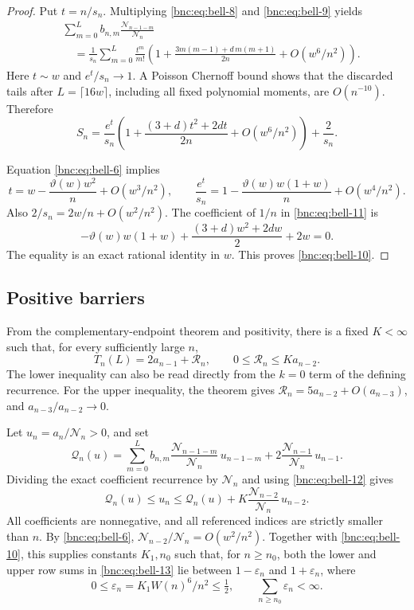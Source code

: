 \documentclass[11pt]{article}
\numberwithin{equation}{section}
\theoremstyle{definition}
\theoremstyle{remark}
\begin{document}
\begin{proof}
Put \(t=n/s_n\).
Multiplying \eqref{bnc:eq:bell-8} and \eqref{bnc:eq:bell-9} yields
\[
 \begin{split}
 &\sum_{m=0}^{L}b_{n,m}
          \frac{\mathcal N_{n-1-m}}{\mathcal N_n}\\
 &\quad=
 \frac1{s_n}\sum_{m=0}^{L}\frac{t^m}{m!}
 \left(1+\frac{3m(m-1)+d\,m(m+1)}{2n}
        +O(w^6/n^2)\right).
 \end{split}
\]
Here \(t\sim w\) and \(e^t/s_n\to1\).
A Poisson Chernoff bound shows that the discarded tails after
\(L=\lceil16w\rceil\), including all fixed polynomial moments,
are \(O(n^{-10})\).
Therefore
\begin{equation}\label{bnc:eq:bell-11}
S_n=\frac{e^t}{s_n}
 \left(1+\frac{(3+d)t^2+2dt}{2n}
         +O(w^6/n^2)\right)+\frac2{s_n}.
\end{equation}

Equation \eqref{bnc:eq:bell-6} implies
\[
 t=w-\frac{\vartheta(w)w^2}{n}+O(w^3/n^2),
 \qquad
 \frac{e^t}{s_n}
 =1-\frac{\vartheta(w)w(1+w)}n+O(w^4/n^2).
\]
Also \(2/s_n=2w/n+O(w^2/n^2)\).
The coefficient of \(1/n\) in \eqref{bnc:eq:bell-11} is
\[
 -\vartheta(w)w(1+w)
   +\frac{(3+d)w^2+2dw}{2}+2w=0.
\]
The equality is an exact rational identity in \(w\).
This proves \eqref{bnc:eq:bell-10}.
\end{proof}

\subsection{Positive barriers}

From the complementary-endpoint theorem and positivity,
there is a fixed \(K<\infty\) such that, for every sufficiently
large \(n\),
\begin{equation}\label{bnc:eq:bell-12}
T_n(L)=2a_{n-1}+\mathcal R_n,\qquad
 0\le \mathcal R_n\le K a_{n-2}.
\end{equation}
The lower inequality can also be read directly from the \(k=0\)
term of the defining recurrence.
For the upper inequality, the theorem gives
\(\mathcal R_n=5a_{n-2}+O(a_{n-3})\), and
\(a_{n-3}/a_{n-2}\to0\).

Let \(u_n=a_n/\mathcal N_n>0\), and set
\[
 \mathcal Q_n(u)=
 \sum_{m=0}^{L}b_{n,m}
       \frac{\mathcal N_{n-1-m}}{\mathcal N_n}\,u_{n-1-m}
       +2\frac{\mathcal N_{n-1}}{\mathcal N_n}\,u_{n-1}.
\]
Dividing the exact coefficient recurrence by \(\mathcal N_n\)
and using \eqref{bnc:eq:bell-12} gives
\begin{equation}\label{bnc:eq:bell-13}
\mathcal Q_n(u)\le u_n
 \le \mathcal Q_n(u)
      +K\frac{\mathcal N_{n-2}}{\mathcal N_n}\,u_{n-2}.
\end{equation}
All coefficients are nonnegative, and all referenced indices are
strictly smaller than \(n\).
By \eqref{bnc:eq:bell-6},
\(\mathcal N_{n-2}/\mathcal N_n=O(w^2/n^2)\).
Together with \eqref{bnc:eq:bell-10}, this supplies constants \(K_1,n_0\) such that,
for \(n\ge n_0\), both the lower and upper row sums in \eqref{bnc:eq:bell-13}
lie between \(1-\varepsilon_n\) and \(1+\varepsilon_n\), where
\[
 0\le\varepsilon_n=K_1W(n)^6/n^2\le\tfrac12,
 \qquad \sum_{n\ge n_0}\varepsilon_n<\infty.
\]
\end{document}
